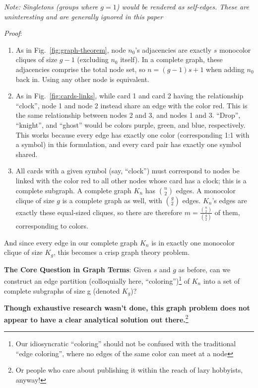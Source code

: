 \documentclass[11pt, oneside]{article} 	%
\begin{document}
\emph{Note: Singletons (groups where $g=1$) would be rendered as self-edges. These are uninteresting and are generally ignored in this paper}

\emph{Proof}:
\begin{enumerate}
\item As in Fig.~\ref{fig:graph-theorem}, node $n_0$'s adjacencies are exactly $s$ monocolor cliques of size $g-1$ (excluding $n_0$ itself). In a complete graph, these adjacencies comprise the total node set, so $n = (g-1)s + 1$ when adding $n_0$ back in. Using any other node is equivalent.
\item As in Fig.~\ref{fig:cards-links}, while card 1 and card 2 having the relationship ``clock'', node 1 and node 2 instead share an edge with the color red. This is the same relationship between nodes 2 and 3, and nodes 1 and 3. ``Drop'', ``knight'', and ``ghost'' would be colors purple, green, and blue, respectively. This works because every edge has exactly one color (corresponding 1:1 with a symbol) in this formulation, and every card pair has exactly one symbol shared.
\item All cards with a given symbol (say, ``clock'') must correspond to nodes be linked with the color red to all other nodes whose card has a clock; this is a complete subgraph. A complete graph $K_n$ has ${n \choose 2}$ edges. A monocolor clique of size $g$ is a complete graph as well, with ${g \choose 2}$ edges. $K_n$'s edges are exactly these equal-sized cliques, so there are therefore $m = \frac{{n \choose 2}}{{g \choose 2}}$ of them, corresponding to colors.
\end{enumerate}

And since every edge in our complete graph $K_n$ is in exactly one monocolor clique of size $K_g$, this becomes a crisp graph theory problem.

\begin{framed}
\textbf{The Core Question in Graph Terms}: Given $s$ and $g$ as before, can we construct an edge partition (colloquially here, ``coloring'')\footnote{Our idiosyncratic ``coloring'' should not be confused with the traditional ``edge coloring'', where no edges of the same color can meet at a node} of $K_n$ into a set of complete subgraphs of size g (denoted $K_g$)?
\end{framed}
\textbf{Though exhaustive research wasn't done, this graph problem does not appear to have a clear analytical solution out there.}\footnote{Or people who care about publishing it within the reach of lazy hobbyists, anyway!}
\end{document}
